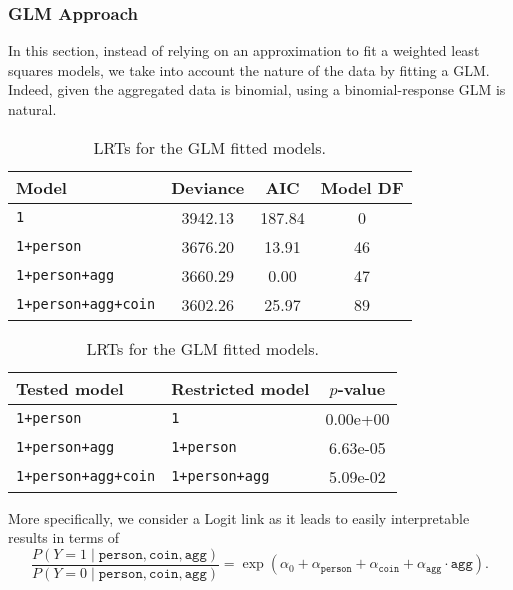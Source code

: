 \documentclass[a4paper, 12pt,oneside]{article}
\begin{document}
			\subsubsection{GLM Approach}
			In this section, instead of relying on an approximation to fit a weighted least squares models, we take into account the nature of the data by fitting a GLM. Indeed, given the aggregated data is binomial, using a binomial-response GLM is natural. 
			\begin{table}[htb]
				\centering
				\begin{subtable}{\textwidth}
					\centering
					\caption{Analysis of deviance of the GLM \texttt{1+person+agg+coin} model and AIC values.}
					\label{tab:glm-model-comparison}
					\begin{tabular}{lccc}
					\toprule
					Model & Deviance & AIC & Model DF \\
					\midrule
					\texttt{1} & 3942.13 & 187.84 & 0 \\
					\texttt{1+person} & 3676.20 & 13.91 & 46 \\
					\texttt{1+person+agg} & 3660.29 & 0.00 & 47 \\
					\texttt{1+person+agg+coin} & 3602.26 & 25.97 & 89 \\
					\bottomrule
					\end{tabular}
				\end{subtable}

				\begin{subtable}{\textwidth}
					\centering
					\caption{LRTs for the GLM fitted models.}
					\label{tab:glm-lrt-comparison}
					\begin{tabular}{llc}
					\toprule
					Tested model & Restricted model & $p$-value \\
					\midrule
					\texttt{1+person} & \texttt{1} & 0.00e+00 \\
					\texttt{1+person+agg} & \texttt{1+person} & 6.63e-05 \\
					\texttt{1+person+agg+coin} & \texttt{1+person+agg} & 5.09e-02 \\
					\bottomrule
					\end{tabular}
				\end{subtable}
			\end{table}

			More specifically, we consider a Logit link as it leads to easily interpretable results in terms of 
			\begin{equation}
				\label{eq:glm_model}
				\frac{P(Y=1\mid \texttt{person},\texttt{coin},\texttt{agg})}{P(Y=0\mid \texttt{person},\texttt{coin},\texttt{agg})} = 
				\exp(\alpha_0 + \alpha_{\texttt{person}}+\alpha_{\texttt{coin}} +\alpha_{\texttt{agg}}\cdot\texttt{agg}).
			\end{equation}
			
\end{document}
